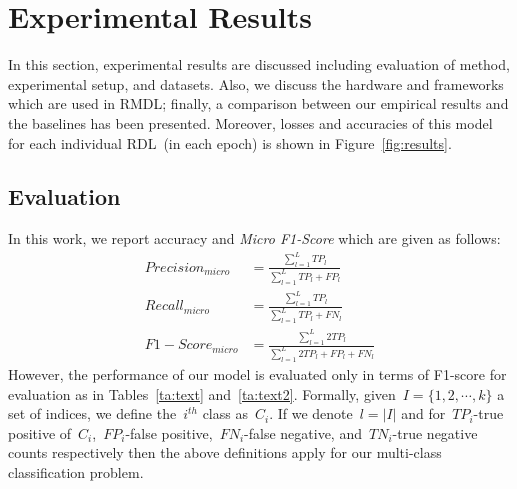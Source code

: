 \documentclass[sigconf, final]{acmart}
\begin{document}
\section{Experimental Results}\label{sec:results}
In this section, experimental results are discussed including evaluation of method, experimental setup, and datasets. Also, we discuss the hardware and frameworks which are used in RMDL; finally, a comparison between our empirical results and the baselines has been presented. Moreover, losses and accuracies of this model for each individual RDL~(in each epoch) is shown in Figure~\ref{fig:results}.

\subsection{Evaluation}\label{subsec:Evaluation}
In this work, we report accuracy and \textit{Micro F1-Score} which are given as follows:
\begin{align}
Precision_{micro} &= \frac{\sum_{l=1}^LTP_l}{\sum_{l=1}^LTP_l+FP_l}\\
Recall_{micro} &= \frac{\sum_{l=1}^LTP_l}{\sum_{l=1}^LTP_l+FN_l}\\
F1-Score_{micro} &=  \frac{\sum_{l=1}^L2TP_l}{\sum_{l=1}^L2TP_l+FP_l+FN_l}
\end{align}
However, the performance of our model is evaluated only in terms of F1-score for evaluation as in Tables~\ref{ta:text} and~\ref{ta:text2}.
Formally, given~$I = \{1,2,\cdots, k\}$ a set of indices, we define the~$i^{th}$ class as~$C_i$. If we denote~$l = |I|$ and for~$TP_i$-true positive of~$C_i$,~$FP_i$-false
positive,~$FN_i$-false negative, and~$TN_i$-true negative counts respectively then the above definitions apply for our multi-class classification problem.
\end{document}

